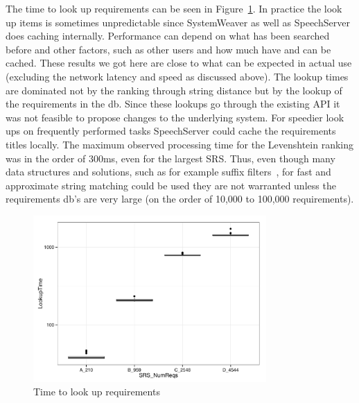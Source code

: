 \documentclass[conference]{IEEEtran}
\begin{document}

The time to look up requirements can be seen in Figure~\ref{fig:boxplots}.
In practice the look up items is sometimes unpredictable since SystemWeaver as well as SpeechServer does caching internally.
Performance can depend on what has been searched before and other factors, such as other users and how much have and can be cached. 
These results we got here are close to what can be expected in actual use (excluding the network latency and speed as discussed above).
The lookup times are dominated not by the ranking through string distance but by the lookup of the requirements in the db.
Since these lookups go through the existing API it was not feasible to propose changes to the underlying system.
For speedier look ups on frequently performed tasks SpeechServer could cache the requirements titles locally.
The maximum observed processing time for the Levenshtein ranking was in the order of 300ms, even for the largest SRS.
Thus, even though many data structures and solutions, such as for example suffix filters~\cite{karkkainen2007faster}, for fast and approximate string matching could be used they are not warranted unless the requirements db's are very large (on the order of 10,000 to 100,000 requirements).


\begin{figure}[!t]
\centering
\includegraphics[width=3.5in]{pdf/boxplots.pdf}
\caption{Time to look up requirements}
\label{fig:boxplots}
\end{figure}



\end{document}

